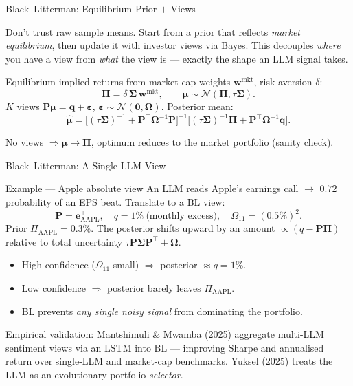 \documentclass[9pt,t]{beamer}
\begin{document}
\begin{frame}{Black--Litterman: Equilibrium Prior $+$ Views}
\begin{bigpicture}
Don't trust raw sample means. Start from a prior that reflects \emph{market equilibrium},
then update it with investor views via Bayes. This decouples \emph{where} you have a
view from \emph{what} the view is --- exactly the shape an LLM signal takes.
\end{bigpicture}

\begin{underhood}
Equilibrium implied returns from market-cap weights $\mathbf{w}^{\text{mkt}}$, risk aversion $\delta$:
\[
\boldsymbol{\Pi}=\delta\,\boldsymbol{\Sigma}\,\mathbf{w}^{\text{mkt}},
\qquad \boldsymbol{\mu}\sim\mathcal{N}(\boldsymbol{\Pi},\tau\boldsymbol{\Sigma}).
\]
$K$ views $\mathbf{P}\boldsymbol{\mu}=\mathbf{q}+\boldsymbol{\varepsilon}$,
$\boldsymbol{\varepsilon}\sim\mathcal{N}(\mathbf{0},\boldsymbol{\Omega})$. Posterior mean:
\[
\hat{\boldsymbol{\mu}}=
\bigl[(\tau\boldsymbol{\Sigma})^{-1}+\mathbf{P}^\top\boldsymbol{\Omega}^{-1}\mathbf{P}\bigr]^{-1}
\bigl[(\tau\boldsymbol{\Sigma})^{-1}\boldsymbol{\Pi}+\mathbf{P}^\top\boldsymbol{\Omega}^{-1}\mathbf{q}\bigr].
\]
\end{underhood}
No views $\Rightarrow \hat{\boldsymbol{\mu}}\to\boldsymbol{\Pi}$, optimum reduces to the market portfolio (sanity check).
\end{frame}

\begin{frame}{Black--Litterman: A Single LLM View}
\begin{exampleblock}{Example --- Apple absolute view}
An LLM reads Apple's earnings call $\to$ $0.72$ probability of an EPS beat.
Translate to a BL view:
\[
\mathbf{P}=\mathbf{e}_{\text{AAPL}}^\top,\quad q=1\%\ \text{(monthly excess)},\quad
\Omega_{11}=(0.5\%)^2.
\]
Prior $\Pi_{\text{AAPL}}=0.3\%$. The posterior shifts upward by an amount
$\propto (q-\mathbf{P}\boldsymbol{\Pi})$ relative to total uncertainty
$\tau\mathbf{P}\boldsymbol{\Sigma}\mathbf{P}^\top+\boldsymbol{\Omega}$.
\end{exampleblock}

\begin{itemize}
  \item High confidence ($\Omega_{11}$ small) $\Rightarrow$ posterior $\approx q=1\%$.
  \item Low confidence $\Rightarrow$ posterior barely leaves $\Pi_{\text{AAPL}}$.
  \item BL prevents \emph{any single noisy signal} from dominating the portfolio.
\end{itemize}

\medskip
\footnotesize Empirical validation: Mantshimuli \& Mwamba (2025) aggregate multi-LLM
sentiment views via an LSTM into BL --- improving Sharpe and annualised return over
single-LLM and market-cap benchmarks. Yuksel (2025) treats the LLM as an
evolutionary portfolio \emph{selector}.
\end{frame}
\end{document}
